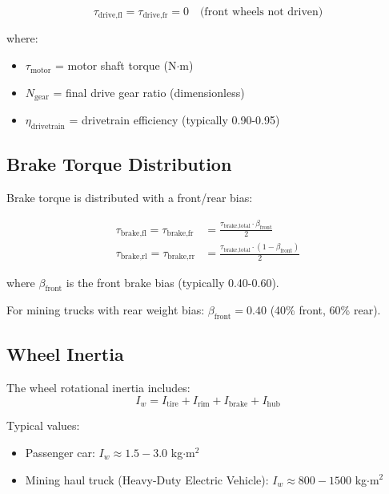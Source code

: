 \documentclass[11pt,a4paper]{article}
\begin{document}
\begin{equation}
\tau_{\text{drive,fl}} = \tau_{\text{drive,fr}} = 0 \quad \text{(front wheels not driven)}
\end{equation}

where:
\begin{itemize}
    \item $\tau_{\text{motor}}$ = motor shaft torque (N$\cdot$m)
    \item $N_{\text{gear}}$ = final drive gear ratio (dimensionless)
    \item $\eta_{\text{drivetrain}}$ = drivetrain efficiency (typically 0.90-0.95)
\end{itemize}

\subsection{Brake Torque Distribution}

Brake torque is distributed with a front/rear bias:

\begin{align}
\tau_{\text{brake,fl}} = \tau_{\text{brake,fr}} &= \frac{\tau_{\text{brake,total}} \cdot \beta_{\text{front}}}{2} \\
\tau_{\text{brake,rl}} = \tau_{\text{brake,rr}} &= \frac{\tau_{\text{brake,total}} \cdot (1 - \beta_{\text{front}})}{2}
\end{align}

where $\beta_{\text{front}}$ is the front brake bias (typically 0.40-0.60).

For mining trucks with rear weight bias: $\beta_{\text{front}} = 0.40$ (40\% front, 60\% rear).

\subsection{Wheel Inertia}

The wheel rotational inertia includes:
\begin{equation}
I_w = I_{\text{tire}} + I_{\text{rim}} + I_{\text{brake}} + I_{\text{hub}}
\end{equation}

Typical values:
\begin{itemize}
    \item Passenger car: $I_w \approx 1.5-3.0$ kg$\cdot$m$^2$
    \item Mining haul truck (Heavy-Duty Electric Vehicle): $I_w \approx 800-1500$ kg$\cdot$m$^2$
\end{itemize}
\end{document}
